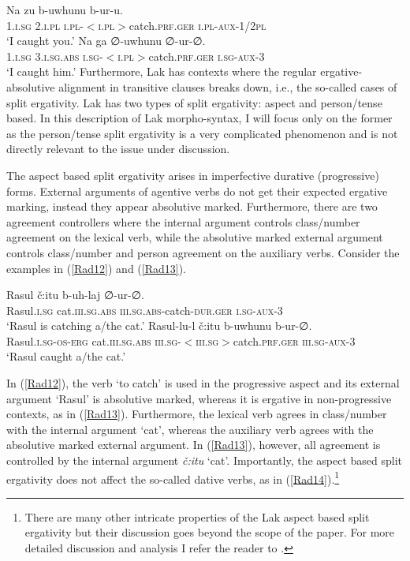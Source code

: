 \documentclass[output=paper]{langscibook}
\begin{document}
\ea\label{Rad10}
\gll Na zu b-uwhunu b-ur-u.\\
\textsc{1.i.sg}  \textsc{2.i.pl} \textsc{i.pl-$<$i.pl$>$}catch.\textsc{prf.ger} \textsc{i.pl-aux-1/2pl}\\
\glt ‘I caught you.’
\ex\label{Rad11}
\gll Na ga ∅-uwhunu ∅-ur-∅.\\
\textsc{1.i.sg}	\textsc{3.i.sg.abs} \textsc{i.sg-$<$i.pl$>$}catch.\textsc{prf.ger} \textsc{i.sg-aux-3}\\
\glt ‘I caught him.’
\z
Furthermore, Lak has contexts where the regular ergative-absolutive alignment in transitive clauses breaks down, i.e., the so-called cases of split ergativity. Lak has two types of split ergativity: aspect and person/tense based. In this description of Lak morpho-syntax, I will focus only on the former as the person/tense split ergativity is a very complicated phenomenon and is not directly relevant to the issue under discussion.

The aspect based split ergativity arises in imperfective durative (progressive) forms. External arguments of agentive verbs do not get their expected ergative marking, instead they appear absolutive marked. Furthermore, there are two agreement controllers where the internal argument controls class/number agreement on the lexical verb, while the absolutive marked external argument controls class/number and person agreement on the auxiliary verbs. Consider the examples in (\ref{Rad12}) and (\ref{Rad13}).

\ea\label{Rad12}
\gll Rasul č:itu b-uh-laj ∅-ur-∅.\\
Rasul.\textsc{i.sg} cat.\textsc{iii.sg.abs} \textsc{iii.sg.abs}-catch-\textsc{dur.ger} \textsc{i.sg-aux-3}\\
\glt ‘Rasul is catching a/the cat.’
\ex\label{Rad13}
\gll Rasul-lu-l č:itu b-uwhunu b-ur-∅.\\
Rasul.\textsc{i.sg-os-erg} cat.\textsc{iii.sg.abs} \textsc{iii.sg-$<$iii.sg$>$}catch.\textsc{prf.ger} \textsc{iii.sg-aux-3}\\
\glt ‘Rasul caught a/the cat.’
\z

In (\ref{Rad12}), the verb ‘to catch’ is used in the progressive aspect and its external argument ‘Rasul’ is absolutive marked, whereas it is ergative in non-progressive contexts, as in (\ref{Rad13}). Furthermore, the lexical verb agrees in class/number with the internal argument ‘cat’, whereas the auxiliary verb agrees with the absolutive marked external argument. In (\ref{Rad13}), however, all agreement is controlled by the internal argument \textit{č:itu} ‘cat’. Importantly, the aspect based split ergativity does not affect the so-called dative verbs, as in (\ref{Rad14}).\footnote{There are many other intricate properties of the Lak aspect based split ergativity but their discussion goes beyond the scope of the paper. For more detailed discussion and analysis I refer the reader to \citet{GagliardiRadkevich2014}.} 
\end{document}
